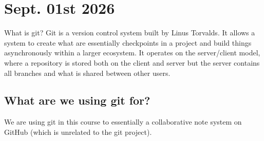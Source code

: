 \documentclass{article}
\begin{document}
\section{Sept. 01st 2026}
What is git? Git is a version control system built by Linus Torvalds.
It allows a system to create what are essentially checkpoints in a project
and build things asynchronously within a larger ecosystem. It operates on the
server/client model, where a repository is stored both on the client and server
but the server contains all branches and what is shared between other users.\\

\subsection{What are we using git for?}
We are using git in this course to essentially a collaborative note system
on GitHub (which is unrelated to the git project).
\end{document}
